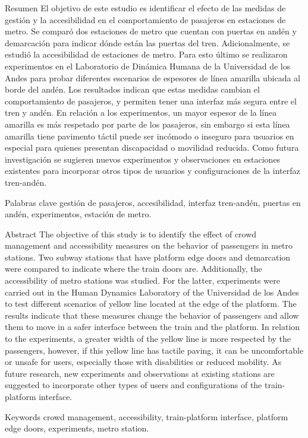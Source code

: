 \itemprimerapagina
{Resumen}
    {
        El objetivo de este estudio es identificar el efecto de las medidas de gestión y la accesibilidad en el comportamiento de pasajeros en estaciones de metro. Se comparó dos estaciones de metro que cuentan con puertas en andén y demarcación para indicar dónde están las puertas del tren. Adicionalmente, se estudió la accesibilidad de estaciones de metro. Para esto último se realizaron experimentos en el Laboratorio de Dinámica Humana de la Universidad de los Andes para probar diferentes escenarios de espesores de línea amarilla ubicada al borde del andén. Los resultados indican que estas medidas cambian el comportamiento de pasajeros, y permiten tener una interfaz más segura entre el tren y andén. En relación a los experimentos, un mayor espesor de la línea amarilla es más respetado por parte de los pasajeros, sin embargo si esta línea amarilla tiene pavimento táctil puede ser incómodo o inseguro para usuarios en especial para quienes presentan discapacidad o movilidad reducida. Como futura investigación se sugieren nuevos experimentos y observaciones en estaciones existentes para incorporar otros tipos de usuarios y configuraciones de la interfaz tren-andén.
    }

\itemprimerapagina
{Palabras clave}
    {
        gestión de pasajeros, accesibilidad, interfaz tren-andén, puertas en andén, experimentos, estación de metro.
    }

\itemprimerapaginacursiva
{Abstract}
    {
        The objective of this study is to identify the effect of crowd management and accessibility measures on the behavior of passengers in metro stations. Two subway stations that have platform edge doors and demarcation were compared to indicate where the train doors are. Additionally, the accessibility of metro stations was studied. For the latter, experiments were carried out in the Human Dynamics Laboratory of the Universidad de los Andes to test different scenarios of yellow line located at the edge of the platform. The results indicate that these measures change the behavior of passengers and allow them to move in a safer interface between the train and the platform. In relation to the experiments, a greater width of the yellow line is more respected by the passengers, however, if this yellow line has tactile paving, it can be uncomfortable or unsafe for users, especially those with disabilities or reduced mobility. As future research, new experiments and observations at existing stations are suggested to incorporate other types of users and configurations of the train-platform interface.
    }

\itemprimerapaginacursiva
{Keywords}
    {
        crowd management, accessibility, train-platform interface, platform edge doors, experiments, metro station.
    }